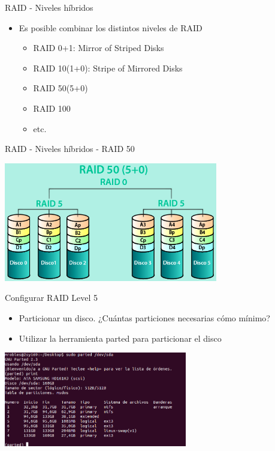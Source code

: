 \begin{frame}{RAID - Niveles híbridos}
 \begin{itemize}
  \item Es posible combinar los distintos niveles de RAID
  \begin{itemize}
   \item RAID 0+1: Mirror of Striped Disks
   \item RAID 10(1+0): Stripe of Mirrored Disks
   \item RAID 50(5+0)
   \item RAID 100
   \item etc.
  \end{itemize}
 \end{itemize}
\end{frame}

\begin{frame}{RAID - Niveles híbridos - RAID 50}
 \begin{center}
  \includegraphics[width=0.7\textwidth]{images/raid50.png}
 \end{center}
\end{frame}

\begin{frame}{Configurar RAID Level 5}
 \begin{itemize}
  \item Particionar un disco. ¿Cuántas particiones necesarias cómo mínimo?
  \item Utilizar la herramienta parted para particionar el disco
 \end{itemize}
 \begin{center}
  \includegraphics[width=0.6\textwidth]{images/partedmbr.png}
 \end{center}
\end{frame}

